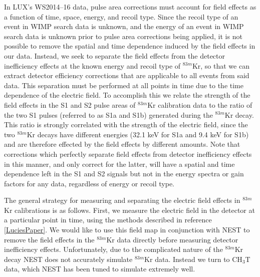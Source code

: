 \documentclass[a4paper,10pt,twocolumn]{article}
\begin{document}
In LUX's WS2014–16 data, pulse area corrections must account for field effects as a function of time, space, energy, and recoil type.  Since the recoil type of an event in WIMP search data is unknown, and the energy of an event in WIMP search data is unknown prior to pulse area corrections being applied, it is not possible to remove the spatial and time dependence induced by the field effects in our data.  Instead, we seek to separate the field effects from the detector inefficiency effects at the known energy and recoil type of $^{83m}$Kr, so that we can extract detector efficiency corrections that are applicable to all events from said data.  This separation must be performed at all points in time due to the time dependence of the electric field.  To accomplish this we relate the strength of the field effects in the S1 and S2 pulse areas of $^{83m}$Kr calibration data to the ratio of the two S1 pulses (referred to as S1a and S1b) generated during the $^{83m}$Kr decay.  This ratio is strongly correlated with the strength of the electric field, since the two $^{83m}$Kr decays have different energies (32.1 keV for S1a and 9.4 keV for S1b) and are therefore effected by the field effects by different amounts.  Note that corrections which perfectly separate field effects from detector inefficiency effects in this manner, and only correct for the latter, will have a spatial and time dependence left in the S1 and S2 signals but not in the energy spectra or gain factors for any data, regardless of energy or recoil type.

The general strategy for measuring and separating the electric field effects in $^{83m}$Kr calibrations is as follows.  First, we measure the electric field in the detector at a particular point in time, using the methods described in reference \ref{LuciesPaper}.  We would like to use this field map in conjunction with NEST to remove the field effects in the $^{83m}$Kr data directly before measuring detector inefficiency effects.  Unfortunately, due to the complicated nature of the $^{83m}$Kr decay NEST does not accurately simulate $^{83m}$Kr data.  Instead we turn to CH$_3$T data, which NEST has been tuned to simulate extremely well.  
\end{document}
